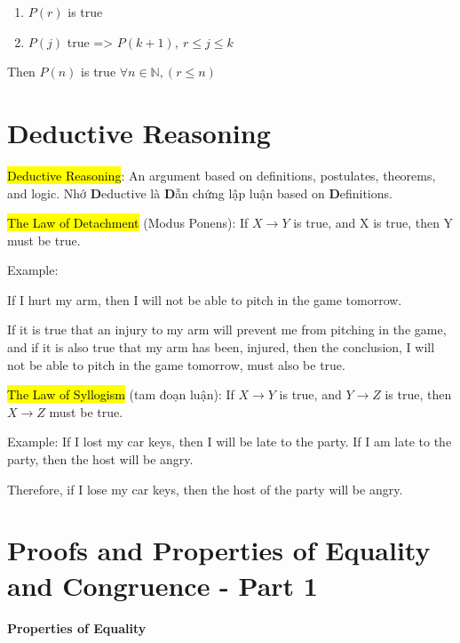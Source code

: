 \begin{enumerate}
  \item $P(r)$ is true
  \item $P(j)$ true => $P(k+1),\ r\leq j \leq k$
\end{enumerate}

Then $P(n)$ is true $\forall n\in \mathbb{N}, (r \leq n)$

\section{Deductive Reasoning}

\hl{Deductive Reasoning}: An argument based on definitions, postulates, theorems, and logic. Nhớ \textbf{D}eductive là \textbf{D}ẫn chứng lập luận based on \textbf{D}efinitions.

\vspace{.4cm}

\hl{The Law of Detachment} (Modus Ponens): If $X \rightarrow Y$ is true, and X is true, then Y must be true.

Example:

If I hurt my arm, then I will not be able to pitch in the game tomorrow.

If it is true that an injury to my arm will prevent me from pitching in the game, and if it is also true that my arm has been, injured, then the conclusion, I will not be able to pitch in the game tomorrow, must also be true.

\vspace{.5cm}

\hl{The Law of Syllogism} (tam đoạn luận): If $X \rightarrow Y$ is true, and $Y \rightarrow Z$ is true, then $X \rightarrow Z$ must be true.

Example: If I lost my car keys, then I will be late to the party. If I am late to the party, then the host will be angry.

Therefore, if I lose my car keys, then the host of the party will be angry.

\section{Proofs and Properties of Equality and Congruence - Part 1}

\vspace{0.3 cm}

\centerline{\textbf{\LARGE Properties of Equality}}

\vspace{0.5cm}

